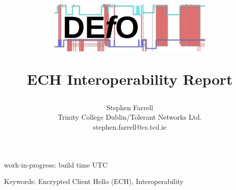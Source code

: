 \documentclass[a4paper]{article}
\begin{document}

\title{
    \begin{center}
\includegraphics[width=0.6\textwidth]{defologo.png}
    \end{center}
ECH Interoperability Report
}

\author{
Stephen Farrell\\
Trinity College Dublin/Tolerant Networks Ltd.\\
\small
stephen.farrell@cs.tcd.ie\\
\normalsize
}





\maketitle
\begin{center}
\small
work-in-progress: build time {\currenttime} UTC\\
\normalsize
\end{center}



\clearpage
\tableofcontents

Keywords: Encrypted Client Hello (ECH), Interoperability












\appendices


\end{document}
